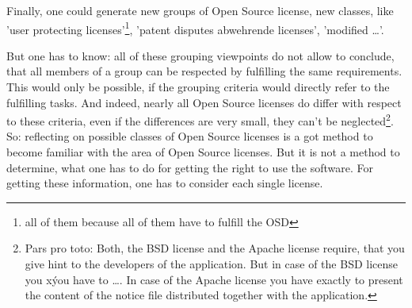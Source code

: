 

Finally, one could generate new groups of Open Source license, new classes, like
'user protecting licenses'\footnote{all of them because all of them have to
fulfill the OSD}, 'patent disputes abwehrende licenses', 'modified \ldots'.

But one has to know: all of these grouping viewpoints do not allow to conclude,
that all members of a group can be respected by fulfilling the same
requirements. This would only be possible, if the grouping criteria would
directly refer to the fulfilling tasks. And indeed, nearly all Open Source
licenses do differ with respect to these criteria, even if the differences are
very small, they can't be neglected\footnote{Pars pro toto: Both, the BSD
license and the Apache license require, that you give hint to the developers of
the application. But in case of the BSD license you xýou have to \ldots. In case
of the Apache license you have exactly to present the content of the notice file
distributed together with the application.}. So: reflecting on possible classes
of Open Source licenses is a got method to become familiar with the area of Open
Source licenses. But it is not a method to determine, what one has to do for
getting the right to use the software. For getting these information, one has to
consider each single license.


%
